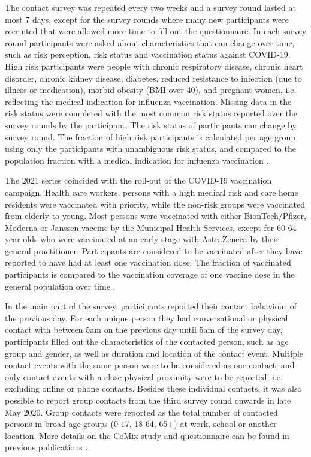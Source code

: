\documentclass[fleqn,10pt]{wlscirep}
\begin{document}
The contact survey was repeated every two weeks and a survey round lasted at most 7 days, except for the survey rounds where many new participants were recruited that were allowed more time to fill out the questionnaire. In each survey round participants were asked about characteristics that can change over time, such as risk perception, risk status and vaccination status against COVID-19. High risk participants were people with chronic respiratory disease, chronic heart disorder, chronic kidney disease, diabetes, reduced resistance to infection (due to illness or medication), morbid obesity (BMI over 40), and pregnant women, i.e. reflecting the medical indication for influenza vaccination. Missing data in the risk status were completed with the most common risk status reported over the survey rounds by the participant. The risk status of participants can change by survey round. The fraction of high risk participants is calculated per age group using only the participants with unambiguous risk status, and compared to the population fraction with a medical indication for influenza vaccination \cite{Nivel_2021}. 

The 2021 series coincided with the roll-out of the COVID-19 vaccination campaign. Health care workers, persons with a high medical risk and care home residents were vaccinated with priority, while the non-risk groups were vaccinated from elderly to young. Most persons were vaccinated with either BionTech/Pfizer, Moderna or Janssen vaccine by the Municipal Health Services, except for 60-64 year olds who were vaccinated at an early stage with AstraZeneca by their general practitioner. Participants are considered to be vaccinated after they have reported to have had at least one vaccination dose. The fraction of vaccinated participants is compared to the vaccination coverage of one vaccine dose in the general population over time \cite{RIVM_2022}. 

In the main part of the survey, participants reported their contact behaviour of the previous day. For each unique person they had conversational or physical contact with between 5am on the previous day until 5am of the survey day, participants filled out the characteristics of the contacted person, such as age group and gender, as well as duration and location of the contact event. Multiple contact events with the same person were to be considered as one contact, and only contact events with a close physical proximity were to be reported, i.e. excluding online or phone contacts. Besides these individual contacts, it was also possible to report group contacts from the third survey round onwards in late May 2020. Group contacts were reported as the total number of contacted persons in broad age groups (0-17, 18-64, 65+) at work, school or another location. More details on the CoMix study and questionnaire can be found in previous publications \cite{Jarvis_2020, Verelst_2021, Gimma_2022}.
\end{document}

